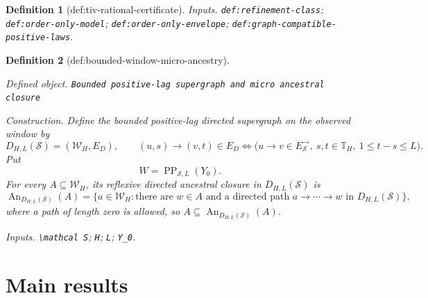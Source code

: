 \documentclass{article}
\newtheorem{definition}{Definition}
\begin{document}
\begin{definition}[def:tiv-rational-certificate]
\par\smallskip\noindent\emph{Inputs.} \texttt{def:\allowbreak{}refinement-\allowbreak{}class}; \texttt{def:\allowbreak{}order-\allowbreak{}only-\allowbreak{}model}; \texttt{def:\allowbreak{}order-\allowbreak{}only-\allowbreak{}envelope}; \texttt{def:\allowbreak{}graph-\allowbreak{}compatible-\allowbreak{}positive-\allowbreak{}laws}.
\end{definition}

\begin{definition}[def:bounded-window-micro-ancestry]\label{def:bounded-window-micro-ancestry}
\par\smallskip\noindent\emph{Defined object.} \texttt{Bounded positive-\allowbreak{}lag supergraph and micro ancestral closure}
\par\smallskip\noindent\emph{Construction.} Define the bounded positive-lag directed supergraph on the observed window by
\[
D_{H,L}(\mathcal S)=(\mathcal W_H,E_D),
\qquad
(u,s)\to(v,t)\in E_D
\Longleftrightarrow
\bigl(u\to v\in E_{\mathcal S}^{\to},\ s,t\in\mathbb T_H,\ 1\le t-s\le L\bigr).
\]
Put
\[
W=\operatorname{PP}_{\mathcal S,L}(Y_0).
\]
For every \(A\subseteq\mathcal W_H\), its reflexive directed ancestral closure in \(D_{H,L}(\mathcal S)\) is
\[
\operatorname{An}_{D_{H,L}(\mathcal S)}(A)
=\bigl\{a\in\mathcal W_H:\text{there are }w\in A\text{ and a directed path }a\to\cdots\to w\text{ in }D_{H,L}(\mathcal S)\bigr\},
\]
where a path of length zero is allowed, so \(A\subseteq\operatorname{An}_{D_{H,L}(\mathcal S)}(A)\).
\par\smallskip\noindent\emph{Inputs.} \texttt{\textbackslash{}\allowbreak{}mathcal S}; \texttt{H}; \texttt{L}; \texttt{Y\_\allowbreak{}0}.
\end{definition}

\section{Main results}
\end{document}
